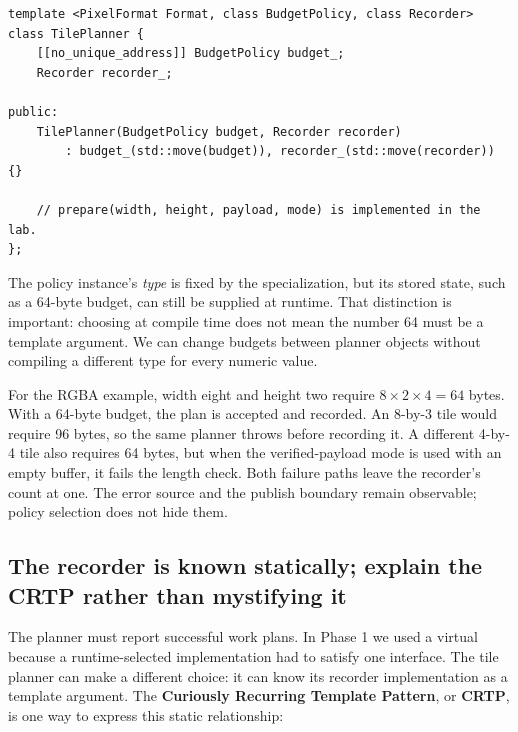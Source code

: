 \begin{verbatim}
template <PixelFormat Format, class BudgetPolicy, class Recorder>
class TilePlanner {
    [[no_unique_address]] BudgetPolicy budget_;
    Recorder recorder_;

public:
    TilePlanner(BudgetPolicy budget, Recorder recorder)
        : budget_(std::move(budget)), recorder_(std::move(recorder)) {}

    // prepare(width, height, payload, mode) is implemented in the lab.
};
\end{verbatim}

The policy instance's \emph{type} is fixed by the specialization, but its stored state, such as a 64-byte budget, can still be supplied at runtime. That distinction is important: choosing  at compile time does not mean the number 64 must be a template argument. We can change budgets between planner objects without compiling a different type for every numeric value.

For the RGBA example, width eight and height two require \(8\times2\times4=64\) bytes. With a 64-byte budget, the plan is accepted and recorded. An 8-by-3 tile would require 96 bytes, so the same planner throws before recording it. A different 4-by-4 tile also requires 64 bytes, but when the verified-payload mode is used with an empty buffer, it fails the length check. Both failure paths leave the recorder's count at one. The error source and the publish boundary remain observable; policy selection does not hide them.

\subsection{The recorder is known statically; explain the CRTP rather than mystifying it}\label{01-foundations-i-ch005-the-recorder-is-known-statically-explain-the-crtp-rather-than-mystifying-it}

\hypertarget{01-foundations-i-ch005-the-recorder-is-known-statically-explain-the-crtp-rather-than-mystifying-it}{}

The planner must report successful work plans. In Phase 1 we used a virtual  because a runtime-selected implementation had to satisfy one interface. The tile planner can make a different choice: it can know its recorder implementation as a template argument. The \textbf{Curiously Recurring Template Pattern}, or \textbf{CRTP}, is one way to express this static relationship:

